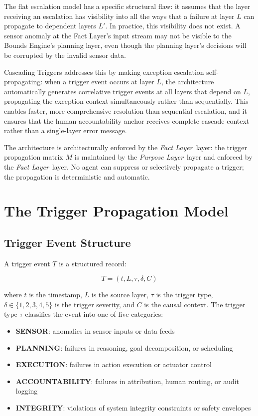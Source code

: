 \documentclass[12pt]{article}
\newcommand{\purpose}{\textit{Purpose Layer}}
\newcommand{\fact}{\textit{Fact Layer}}
\begin{document}
The flat escalation model has a specific structural flaw: it assumes that the layer receiving an escalation has visibility into all the ways that a failure at layer $L$ can propagate to dependent layers $L'$. In practice, this visibility does not exist. A sensor anomaly at the Fact Layer's input stream may not be visible to the Bounds Engine's planning layer, even though the planning layer's decisions will be corrupted by the invalid sensor data.

Cascading Triggers addresses this by making exception escalation self-propagating: when a trigger event occurs at layer $L$, the architecture automatically generates correlative trigger events at all layers that depend on $L$, propagating the exception context simultaneously rather than sequentially. This enables faster, more comprehensive resolution than sequential escalation, and it ensures that the human accountability anchor receives complete cascade context rather than a single-layer error message.

The architecture is architecturally enforced by the \fact\ layer: the trigger propagation matrix $M$ is maintained by the \purpose\ layer and enforced by the \fact\ layer. No agent can suppress or selectively propagate a trigger; the propagation is deterministic and automatic.

\section{The Trigger Propagation Model}
\label{sec:model}

\subsection{Trigger Event Structure}

A trigger event $T$ is a structured record:

$$T = (t, L, \tau, \delta, C)$$

where $t$ is the timestamp, $L$ is the source layer, $\tau$ is the trigger type, $\delta \in \{1, 2, 3, 4, 5\}$ is the trigger severity, and $C$ is the causal context. The trigger type $\tau$ classifies the event into one of five categories:

\begin{itemize}[noitemsep]
    \item \textbf{SENSOR}: anomalies in sensor inputs or data feeds
    \item \textbf{PLANNING}: failures in reasoning, goal decomposition, or scheduling
    \item \textbf{EXECUTION}: failures in action execution or actuator control
    \item \textbf{ACCOUNTABILITY}: failures in attribution, human routing, or audit logging
    \item \textbf{INTEGRITY}: violations of system integrity constraints or safety envelopes
\end{itemize}
\end{document}
